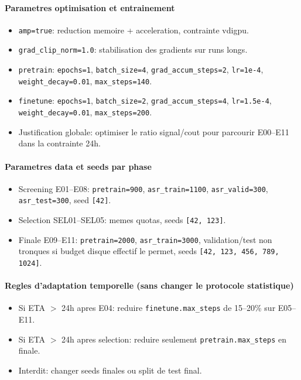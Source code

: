 \documentclass[11pt,a4paper]{article}
\begin{document}
\paragraph{Parametres optimisation et entrainement}
\begin{itemize}
\item \texttt{amp=true}: reduction memoire + acceleration, contrainte vdigpu.
\item \texttt{grad\_clip\_norm=1.0}: stabilisation des gradients sur runs longs.
\item \texttt{pretrain}: \texttt{epochs=1}, \texttt{batch\_size=4}, \texttt{grad\_accum\_steps=2}, \texttt{lr=1e-4}, \texttt{weight\_decay=0.01}, \texttt{max\_steps=140}.
\item \texttt{finetune}: \texttt{epochs=1}, \texttt{batch\_size=2}, \texttt{grad\_accum\_steps=4}, \texttt{lr=1.5e-4}, \texttt{weight\_decay=0.01}, \texttt{max\_steps=200}.
\item Justification globale: optimiser le ratio signal/cout pour parcourir E00--E11 dans la contrainte 24h.
\end{itemize}

\paragraph{Parametres data et seeds par phase}
\begin{itemize}
\item Screening E01--E08: \texttt{pretrain=900}, \texttt{asr\_train=1100}, \texttt{asr\_valid=300}, \texttt{asr\_test=300}, seed \texttt{[42]}.
\item Selection SEL01--SEL05: memes quotas, seeds \texttt{[42, 123]}.
\item Finale E09--E11: \texttt{pretrain=2000}, \texttt{asr\_train=3000}, validation/test non tronques si budget disque effectif le permet, seeds \texttt{[42, 123, 456, 789, 1024]}.
\end{itemize}

\paragraph{Regles d'adaptation temporelle (sans changer le protocole statistique)}
\begin{itemize}
\item Si ETA $>$ 24h apres E04: reduire \texttt{finetune.max\_steps} de 15--20\% sur E05--E11.
\item Si ETA $>$ 24h apres selection: reduire seulement \texttt{pretrain.max\_steps} en finale.
\item Interdit: changer seeds finales ou split de test final.
\end{itemize}
\end{document}
